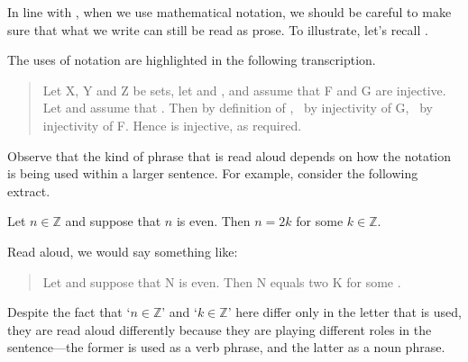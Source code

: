 In line with , when we use mathematical notation, we should be careful to make sure that what we write can still be read as prose. To illustrate, let's recall .

\rxtrInjectiveWithProse*

The uses of notation are highlighted in the following transcription.

\begin{quote}
Let X, Y and Z be sets, let  and  , and assume that F and G are injective. Let   and assume that . Then   by definition of ,  \,  by injectivity of G,  \,  by injectivity of F. Hence  is injective, as required.
\end{quote}

Observe that the kind of phrase that is read aloud depends on how the notation is being used within a larger sentence. For example, consider the following extract.

\begin{extract}
Let $n \in \mathbb{Z}$ and suppose that $n$ is even. Then $n=2k$ for some $k \in \mathbb{Z}$.
\end{extract}

Read aloud, we would say something like:
\begin{quote}
Let  and suppose that N is even. Then N equals two K for some .
\end{quote}
Despite the fact that `$n \in \mathbb{Z}$' and `$k \in \mathbb{Z}$' here differ only in the letter that is used, they are read aloud differently because they are playing different roles in the sentence---the former is used as a verb phrase, and the latter as a noun phrase.

